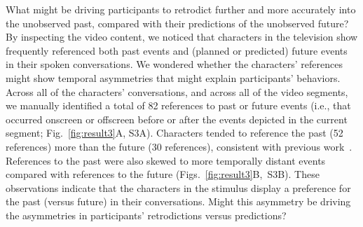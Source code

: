 \documentclass[10pt]{article}
\newcommand{\references}{S3}
\begin{document}
What might be driving participants to retrodict further and more accurately into the unobserved past, compared with their predictions of the unobserved future?  By inspecting the video content, we noticed that characters in the television show frequently referenced both past events and (planned or predicted) future events in their spoken conversations.  We wondered whether the characters' references might show temporal asymmetries that might explain participants' behaviors.  Across all of the characters' conversations, and across all of the video segments, we manually identified a total of 82 references to past or future events (i.e., that occurred onscreen or offscreen before or after the events depicted in the current segment; Fig.~\ref{fig:result3}A, \references A).  Characters tended to reference the past (52 references) more than the future (30 references), consistent with previous work~\citep{DemiEtal18}.  References to the past were also skewed to more temporally distant events compared with references to the future (Figs.~\ref{fig:result3}B,~\references B).  These observations indicate that the characters in the stimulus display a preference for the past (versus future) in their conversations.  Might this asymmetry be driving the asymmetries in participants' retrodictions versus predictions?
\end{document}
